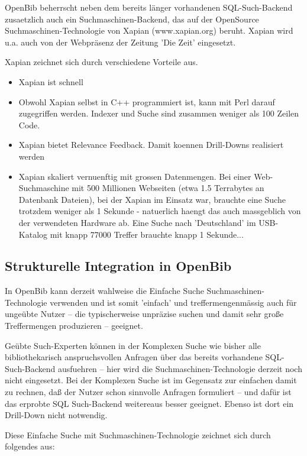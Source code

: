\documentclass[11pt, twoside, a4paper, BCOR8mm, DIV12, bibtotoc,idxtotoc]{scrbook}
\begin{document}
OpenBib beherrscht neben dem bereits länger vorhandenen SQL-Such-Backend
zusaetzlich auch ein Suchmaschinen-Backend, das auf der OpenSource
Suchmaschinen-Technologie von Xapian (www.xapian.org) beruht. Xapian
wird u.a. auch von der Webpräsenz der Zeitung 'Die Zeit' eingesetzt.

Xapian zeichnet sich durch verschiedene Vorteile aus.

\begin{itemize}
\item Xapian ist schnell
\item Obwohl Xapian selbst in C++ programmiert ist, kann mit Perl darauf zugegriffen
werden. Indexer und Suche sind zusammen weniger als 100 Zeilen Code.
\item Xapian bietet Relevance Feedback. Damit koennen Drill-Downs realisiert
werden
\item Xapian skaliert vernuenftig mit grossen Datenmengen. Bei einer
Web-Suchmaschine mit 500 Millionen Webseiten (etwa 1.5 Terrabytes an
Datenbank Dateien), bei der Xapian im Einsatz war, brauchte eine Suche
trotzdem weniger als 1 Sekunde - natuerlich haengt das auch massgeblich von
der verwendeten Hardware ab. Eine Suche nach 'Deutschland' im USB-Katalog
mit knapp 77000 Treffer brauchte knapp 1 Sekunde...
\end{itemize}


\subsection{Strukturelle Integration in OpenBib}

In OpenBib kann derzeit wahlweise die Einfache Suche
Suchmaschinen-Technologie verwenden und ist somit 'einfach' und
treffermengenmässig auch für ungeübte Nutzer -- die typischerweise
unpräzise suchen und damit sehr große Treffermengen produzieren --
geeignet.

Geübte Such-Experten können in der Komplexen Suche wie bisher alle
bibliothekarisch anspruchs\-vollen Anfragen über das bereits vorhandene
SQL-Such-Backend ausfuehren -- hier wird die Suchmaschinen-Technologie
derzeit noch nicht eingesetzt.  Bei der Komplexen Suche ist im
Gegen\-satz zur einfachen damit zu rechnen, daß der Nutzer schon
sinnvolle Anfragen formuliert -- und dafür ist das erprobte SQL
Such-Backend weitereaus besser geeignet. Ebenso ist dort ein
Drill-Down nicht notwendig.

Diese Einfache Suche mit Suchmaschinen-Technologie zeichnet sich durch
folgendes aus:
\end{document}
